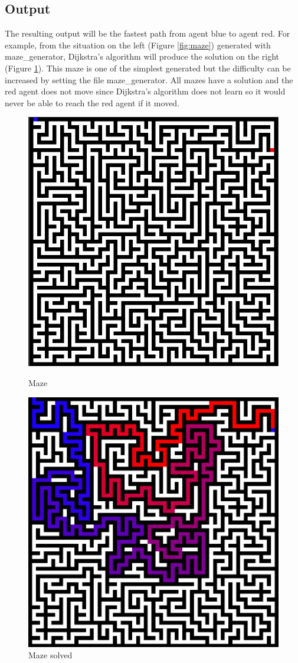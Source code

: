 \subsection{Output}
The resulting output will be the fastest path from agent blue to agent red. For example, from the situation on the left (Figure \ref{fig:maze}) generated with maze\_generator, Dijkstra's algorithm will produce the solution on the right (Figure \ref{fig:mazesolved}). This maze is one of the simplest generated but the difficulty can be increased by setting the file maze\_generator. All mazes have a solution and the red agent does not move since Dijkstra's algorithm does not learn so it would never be able to reach the red agent if it moved.
\begin{figure}[h]
\centering
\begin{minipage}{.5\textwidth}
\centering
 \includegraphics[width=0.8\linewidth]{img/maze}
  \caption{Maze}
  \label{fig:maze}
\end{minipage}%
\begin{minipage}{.5\textwidth}
\centering
	\includegraphics[width=0.8\linewidth]{img/maze_solved}
	\caption{Maze solved}
	 \label{fig:mazesolved}
\end{minipage}

\end{figure}


